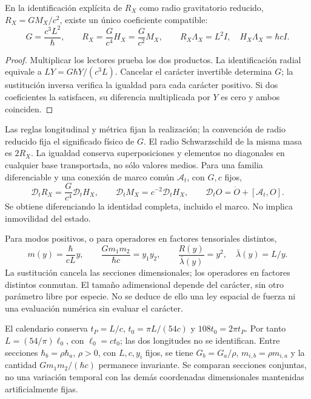 \begin{proposition}
\label{hmtcuatro:gea:coeficiente}
En la identificación explícita de $R_X$ como radio gravitatorio reducido,
$R_X=GM_X/c^2$, existe un único coeficiente compatible:
\begin{equation}
G=\frac{c^3L^2}{\hbar},\qquad
R_X=\frac{G}{c^4}H_X=\frac{G}{c^2}M_X,\qquad
R_X\Lambda_X=L^2I,\quad H_X\Lambda_X=\hbar cI.
\label{hmtcuatro:gea:radial}
\end{equation}
\end{proposition}
\begin{proof}
Multiplicar los lectores prueba los dos productos. La identificación
radial equivale a $LY=G\hbar Y/(c^3L)$.
Cancelar el carácter invertible determina $G$; la sustitución inversa
verifica la igualdad para cada carácter positivo. Si dos coeficientes
la satisfacen, su diferencia multiplicada por $Y$ es cero y ambos coinciden.
\end{proof}

Las reglas longitudinal y métrica fijan la realización; la convención
de radio reducido fija el significado físico de $G$. El radio
Schwarzschild de la misma masa es $2R_X$. La igualdad conserva
superposiciones y elementos no diagonales en cualquier base transportada,
no sólo valores medios. Para una familia diferenciable y una conexión
de marco común $\mathcal A_t$, con $G,c$ fijos,
\begin{equation}
\mathcal D_tR_X=\frac{G}{c^4}\mathcal D_tH_X,\qquad
\mathcal D_tM_X=c^{-2}\mathcal D_tH_X,\qquad
\mathcal D_tO=\dot O+[\mathcal A_t,O].
\label{hmtcuatro:gea:derivada}
\end{equation}
Se obtiene diferenciando la identidad completa, incluido el marco.
No implica inmovilidad del estado.

Para modos positivos, o para operadores en factores tensoriales distintos,
\begin{equation}
m(y)=\frac{\hbar}{cL}y,\qquad
\frac{Gm_1m_2}{\hbar c}=y_1y_2,\qquad
\frac{R(y)}{\bar\lambda(y)}=y^2,\quad \bar\lambda(y)=L/y.
\label{hmtcuatro:gea:adimensional}
\end{equation}
La sustitución cancela las secciones dimensionales; los operadores en
factores distintos conmutan. El tamaño adimensional depende del carácter,
sin otro parámetro libre por especie. No se deduce de ello una ley
espacial de fuerza ni una evaluación numérica sin evaluar el carácter.

El calendario conserva $t_P=L/c$, $t_0=\pi L/(54c)$ y
$108t_0=2\pi t_P$. Por tanto $L=(54/\pi)\ell_0$, con $\ell_0=ct_0$;
las dos longitudes no se identifican. Entre secciones
$\hbar_b=\rho\hbar_a$, $\rho>0$, con $L,c,y_i$ fijos, se tiene
$G_b=G_a/\rho$, $m_{i,b}=\rho m_{i,a}$ y la cantidad
$Gm_1m_2/(\hbar c)$ permanece invariante. Se comparan secciones
conjuntas, no una variación temporal con las demás coordenadas
dimensionales mantenidas artificialmente fijas.

